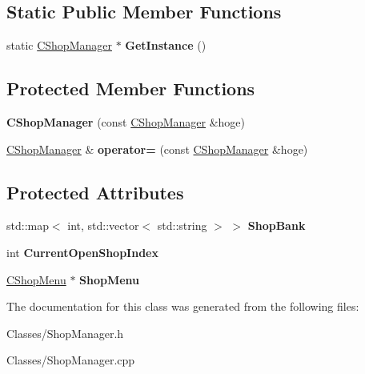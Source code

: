 \subsection*{Static Public Member Functions}
\begin{DoxyCompactItemize}
\item 
static \hyperlink{class_c_shop_manager}{C\+Shop\+Manager} $\ast$ {\bfseries Get\+Instance} ()\hypertarget{class_c_shop_manager_ae312c7619ac9a9e80f9e539923aa3957}{}\label{class_c_shop_manager_ae312c7619ac9a9e80f9e539923aa3957}

\end{DoxyCompactItemize}
\subsection*{Protected Member Functions}
\begin{DoxyCompactItemize}
\item 
{\bfseries C\+Shop\+Manager} (const \hyperlink{class_c_shop_manager}{C\+Shop\+Manager} \&hoge)\hypertarget{class_c_shop_manager_a60216d09d37b0f0d254494f0901720e9}{}\label{class_c_shop_manager_a60216d09d37b0f0d254494f0901720e9}

\item 
\hyperlink{class_c_shop_manager}{C\+Shop\+Manager} \& {\bfseries operator=} (const \hyperlink{class_c_shop_manager}{C\+Shop\+Manager} \&hoge)\hypertarget{class_c_shop_manager_a65deda8f79ea5691c63e2ceb4ab9b2b8}{}\label{class_c_shop_manager_a65deda8f79ea5691c63e2ceb4ab9b2b8}

\end{DoxyCompactItemize}
\subsection*{Protected Attributes}
\begin{DoxyCompactItemize}
\item 
std\+::map$<$ int, std\+::vector$<$ std\+::string $>$ $>$ {\bfseries Shop\+Bank}\hypertarget{class_c_shop_manager_a53009437909f484dafe64dd35aec1e0b}{}\label{class_c_shop_manager_a53009437909f484dafe64dd35aec1e0b}

\item 
int {\bfseries Current\+Open\+Shop\+Index}\hypertarget{class_c_shop_manager_ade3960a1bb8799a10414be657e7d461f}{}\label{class_c_shop_manager_ade3960a1bb8799a10414be657e7d461f}

\item 
\hyperlink{class_c_shop_menu}{C\+Shop\+Menu} $\ast$ {\bfseries Shop\+Menu}\hypertarget{class_c_shop_manager_afc6aa72e25cb31cac4fcb55c7d3c18d0}{}\label{class_c_shop_manager_afc6aa72e25cb31cac4fcb55c7d3c18d0}

\end{DoxyCompactItemize}


The documentation for this class was generated from the following files\+:\begin{DoxyCompactItemize}
\item 
Classes/Shop\+Manager.\+h\item 
Classes/Shop\+Manager.\+cpp\end{DoxyCompactItemize}
